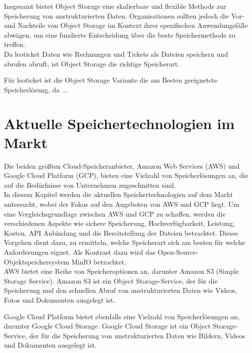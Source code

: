 Insgesamt bietet Object Storage eine skalierbare und flexible Methode zur Speicherung von unstrukturierten Daten. Organisationen sollten jedoch die Vor- und Nachteile von Object Storage im Kontext ihrer spezifischen Anwendungsfälle abwägen, um eine fundierte Entscheidung über die beste Speichermethode zu treffen.\\


Da leoticket Daten wie Rechnungen und Tickets als Dateien speichern und abrufen abruft, ist Object Storage die richtige Speicherart. 

Für leoticket ist die Object Storage Variante die am Besten geeignetste Speicherlösung, da ... %


\section{Aktuelle Speichertechnologien im Markt}

Die beiden größten Cloud-Speicheranbieter, Amazon Web Services (AWS) und Google Cloud Platform (GCP), bieten eine Vielzahl von Speicherlösungen an, die auf die Bedürfnisse von Unternehmen zugeschnitten sind.\\ 

In diesem Kapitel werden die aktuellen Speichertechnologien auf dem Markt untersucht, wobei der Fokus auf den Angeboten von AWS und GCP liegt. Um eine Vergleichsgrundlage zwischen AWS und GCP zu schaffen, werden die verschiedenen Aspekte wie sichere Speicherung, Hochverfügbarkeit, Leistung, Kosten, API Anbindung und die Bereitstellung der Dateien betrachtet. Dieses Vorgehen dient dazu, zu ermitteln, welche Speicherart sich am besten für welche Anforderungen eignet. Als Kontrast dazu wird das Open-Source-Objektspeichersystem MinIO betrachtet.\\

AWS bietet eine Reihe von Speicheroptionen an, darunter Amazon S3 (Simple Storage Service). Amazon S3 ist ein Object Storage-Service, der für die Speicherung und den schnellen Abruf von unstrukturierten Daten wie Videos, Fotos und Dokumenten ausgelegt ist.

Google Cloud Platform bietet ebenfalls eine Vielzahl von Speicherlösungen an, darunter Google Cloud Storage. Google Cloud Storage ist ein Object Storage-Service, der für die Speicherung von unstrukturierten Daten wie Bildern, Videos und Dokumenten ausgelegt ist.\\
 
